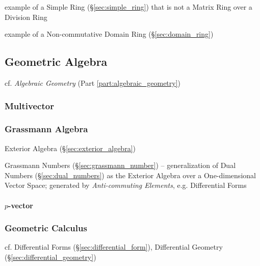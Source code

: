 example of a Simple Ring (\S\ref{sec:simple_ring}) that is not a Matrix Ring
over a Division Ring

example of a Non-commutative Domain Ring (\S\ref{sec:domain_ring})



\subsection{Geometric Algebra}\label{sec:geometric_algebra}

cf. \emph{Algebraic Geometry} (Part \ref{part:algebraic_geometry})



\subsubsection{Multivector}\label{sec:multivector}

\subsubsection{Grassmann Algebra}\label{sec:grassmann_algebra}


Exterior Algebra (\S\ref{sec:exterior_algebra})

\fist Grassmann Numbers (\S\ref{sec:grassmann_number}) -- generalization of Dual
Numbers (\S\ref{sec:dual_numbers}) as the Exterior Algebra over a
One-dimensional Vector Space; generated by \emph{Anti-commuting Elements}, e.g.
Differential Forms



\paragraph{$p$-vector}\label{sec:p_vector}\hfill



\subsubsection{Geometric Calculus}\label{sec:geometric_calculus}

cf. Differential Forms (\S\ref{sec:differential_form}), Differential Geometry
(\S\ref{sec:differential_geometry})



